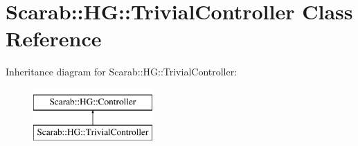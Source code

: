 \hypertarget{classScarab_1_1HG_1_1TrivialController}{
\section{Scarab::HG::TrivialController Class Reference}
\label{classScarab_1_1HG_1_1TrivialController}
}
Inheritance diagram for Scarab::HG::TrivialController:\begin{figure}[H]
\begin{center}
\leavevmode
\includegraphics[height=2cm]{classScarab_1_1HG_1_1TrivialController}
\end{center}
\end{figure}
